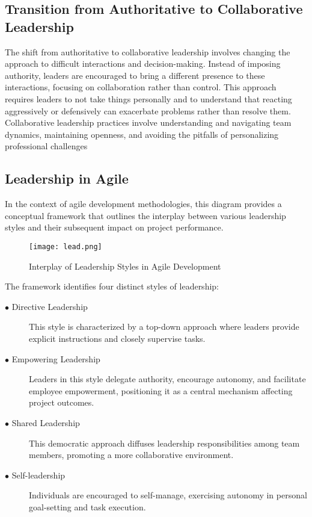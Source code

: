 \documentclass[runningheads]{llncs}
\begin{document}
\subsection{Transition from Authoritative to Collaborative Leadership}

The shift from authoritative to collaborative leadership involves changing the approach to difficult interactions and decision-making. Instead of imposing authority, leaders are encouraged to bring a different presence to these interactions, focusing on collaboration rather than control. This approach requires leaders to not take things personally and to understand that reacting aggressively or defensively can exacerbate problems rather than resolve them. Collaborative leadership practices involve understanding and navigating team dynamics, maintaining openness, and avoiding the pitfalls of personalizing professional challenges


\subsection{Leadership in Agile}

In the context of agile development methodologies, this diagram provides a conceptual framework that outlines the interplay between various leadership styles and their subsequent impact on project performance. 

\begin{figure}[ht]
\centering
\texttt{[image: lead.png]}
\caption{Interplay of Leadership Styles in Agile Development}
\label{fig:leadershipstyles}
\end{figure}

The framework identifies four distinct styles of leadership: \\
\begin{description}

 \item [$\bullet$ Directive Leadership] This style is characterized by a top-down approach where leaders provide explicit instructions and closely supervise tasks. \\

 \item [$\bullet$ Empowering Leadership] Leaders in this style delegate authority, encourage autonomy, and facilitate employee empowerment, positioning it as a central mechanism affecting project outcomes. \\

 \item [$\bullet$ Shared Leadership] This democratic approach diffuses leadership responsibilities among team members, promoting a more collaborative environment. \\

 \item [$\bullet$ Self-leadership] Individuals are encouraged to self-manage, exercising autonomy in personal goal-setting and task execution. \\

\end{description}
\end{document}
